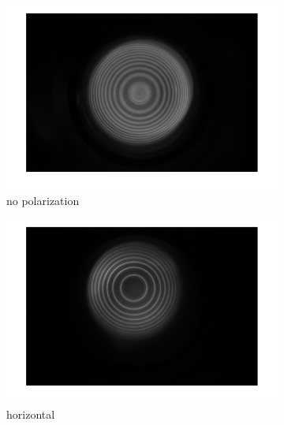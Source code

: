 \documentclass[a4paper,12pt]{article}
\begin{document}
    \begin{figure}[H]
        \centering
        \begin{subfigure}[b]{0.3\textwidth}
            \includegraphics[width=1.2\textwidth]{tra_nor_none.png}
            \caption{no polarization}
        \end{subfigure}
        \space
        \begin{subfigure}[b]{0.3\textwidth}
            \includegraphics[width=1.2\textwidth]{tra_nor_hor.png}
            \caption{horizontal}
        \end{subfigure}
        \space
        \begin{subfigure}[b]{0.3\textwidth}

\end{subfigure}
\end{figure}
\end{document}
